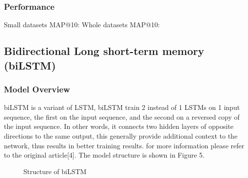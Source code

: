 \documentclass{article}
\begin{document}
\subsubsection{Performance}
Small datasets MAP@10: 
Whole datasets MAP@10: 

\subsection{Bidirectional Long short-term memory (biLSTM)}
\subsubsection{Model Overview}
biLSTM is a variant of LSTM, biLSTM train 2 instead of 1 LSTMs on 1 input sequence, the first on the input sequence, and the second on a reversed copy of the input sequence. In other words, it connects two hidden layers of opposite directions to the same output, this generally provide additional context to the network, thus results in better training results. for more information please refer to the original article[4]. The model structure is shown in Figure 5.
\begin{figure}
  \centering
  \caption{Structure of biLSTM}
\end{figure}
\end{document}
